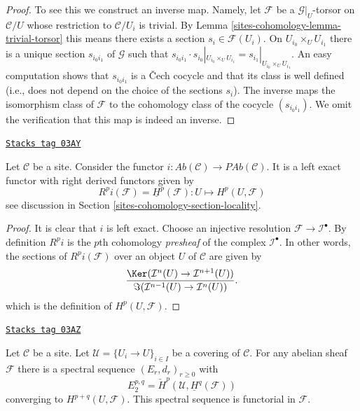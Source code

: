 \begin{proof}
To see this we construct an inverse map. Namely, let $\mathcal{F}$ be a
$\mathcal{G}|_U$-torsor on $\mathcal{C}/U$ whose restriction to
$\mathcal{C}/U_i$ is trivial. By Lemma \ref{sites-cohomology-lemma-trivial-torsor}
this means there
exists a section $s_i \in \mathcal{F}(U_i)$. On $U_{i_0} \times_U U_{i_1}$
there is a unique section $s_{i_0i_1}$ of $\mathcal{G}$ such that
$s_{i_0i_1} \cdot s_{i_0}|_{U_{i_0} \times_U U_{i_1}} =
s_{i_1}|_{U_{i_0} \times_U U_{i_1}}$. An easy computation shows
that $s_{i_0i_1}$ is a {\v C}ech cocycle and that its class is well
defined (i.e., does not depend on the choice of the sections $s_i$).
The inverse maps the isomorphism class of $\mathcal{F}$ to the cohomology
class of the cocycle $(s_{i_0i_1})$.
We omit the verification that this map is indeed an inverse.
\end{proof}

\begin{lemma}[Include]
\label{sites-cohomology-lemma-include}
\href{https://stacks.math.columbia.edu/tag/03AY}{\texttt{Stacks tag 03AY}}

Let $\mathcal{C}$ be a site.
Consider the functor
$i : \textit{Ab}(\mathcal{C}) \to \textit{PAb}(\mathcal{C})$.
It is a left exact functor with right derived functors given by
$$
R^pi(\mathcal{F}) = \underline{H}^p(\mathcal{F}) :
U \longmapsto H^p(U, \mathcal{F})
$$
see discussion in Section \ref{sites-cohomology-section-locality}.
\end{lemma}

\begin{proof}
It is clear that $i$ is left exact.
Choose an injective resolution $\mathcal{F} \to \mathcal{I}^\bullet$.
By definition $R^pi$ is the $p$th cohomology {\it presheaf}
of the complex $\mathcal{I}^\bullet$. In other words, the
sections of $R^pi(\mathcal{F})$ over an object $U$ of $\mathcal{C}$
are given by
$$
\frac{\Ker(\mathcal{I}^n(U) \to \mathcal{I}^{n + 1}(U))}
{\Im(\mathcal{I}^{n - 1}(U) \to \mathcal{I}^n(U))}.
$$
which is the definition of $H^p(U, \mathcal{F})$.
\end{proof}

\begin{lemma}
\label{sites-cohomology-lemma-cech-spectral-sequence}
\href{https://stacks.math.columbia.edu/tag/03AZ}{\texttt{Stacks tag 03AZ}}

Let $\mathcal{C}$ be a site. Let $\mathcal{U} = \{U_i \to U\}_{i \in I}$
be a covering of $\mathcal{C}$. For any abelian sheaf $\mathcal{F}$ there
is a spectral sequence $(E_r, d_r)_{r \geq 0}$ with
$$
E_2^{p, q} = \check{H}^p(\mathcal{U}, \underline{H}^q(\mathcal{F}))
$$
converging to $H^{p + q}(U, \mathcal{F})$.
This spectral sequence is functorial in $\mathcal{F}$.
\end{lemma}

